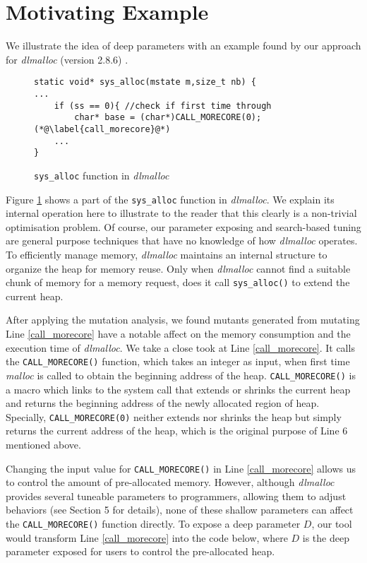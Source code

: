 
\section{Motivating Example}

We illustrate the idea of deep parameters with an example found by our approach for \emph{dlmalloc} (version 2.8.6) \cite{lea1996memory}.

\begin{figure}[ht]
\begin{lstlisting}
static void* sys_alloc(mstate m,size_t nb) {
...
	if (ss == 0){ //check if first time through
		char* base = (char*)CALL_MORECORE(0); (*@\label{call_morecore}@*)
	...
}
\end{lstlisting}
\vspace{-1.5em}
\caption{{\tt sys\_alloc} function in \emph{dlmalloc}}
\label{exp}
\end{figure}

Figure \ref{exp} shows a part of the {\tt sys\_alloc} function in \emph{dlmalloc}. We explain its internal operation here to illustrate to the reader that this clearly is a non-trivial optimisation problem. Of course, our parameter exposing and search-based tuning are general purpose techniques that have no knowledge of how \emph{dlmalloc} operates. To efficiently manage memory, \emph{dlmalloc} maintains an internal structure to organize the heap for memory reuse. Only when \emph{dlmalloc} cannot find a suitable chunk of memory for a memory request, does it call {\tt sys\_alloc()} to extend the current heap.

After applying the mutation analysis, we found mutants generated from mutating Line \ref{call_morecore} have a notable affect on the memory consumption and the execution time of \emph{dlmalloc}. We take a close took at Line \ref{call_morecore}. It calls the {\tt CALL\_MORECORE()} function, which takes an integer as input, when first time \emph{malloc} is called to obtain the beginning address of the heap. {\tt CALL\_MORECORE()} is a macro which links to the system call that extends or shrinks the current heap and returns the beginning address of the newly allocated region of heap. Specially, {\tt CALL\_MORECORE(0)} neither extends nor shrinks the heap but simply returns the current address of the heap, which is the original purpose of Line 6 mentioned above.

Changing the input value for {\tt CALL\_MORECORE()} in Line \ref{call_morecore} allows us to control the amount of pre-allocated memory. However, although \emph{dlmalloc} provides several tuneable parameters to programmers, allowing them to adjust behaviors (see Section 5 for details), none of these shallow parameters can affect the {\tt CALL\_MORECORE()} function directly. To expose a deep parameter $D$, our tool would transform Line \ref{call_morecore} into the code below, where $D$ is the deep parameter exposed for users to control the pre-allocated heap.


